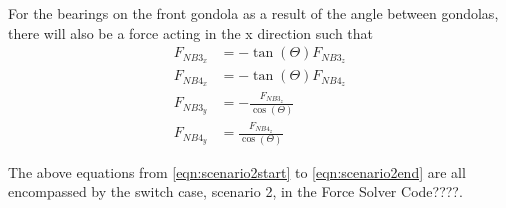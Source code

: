 \documentclass[../main.tex]{subfiles}
\begin{document}
For the bearings on the front gondola as a result of the  angle between gondolas, there will also be a force acting in the x direction such that 
\begin{align}
F_{NB3_{x}} &= -\tan(\Theta) F_{NB3_{z}}\\ 
F_{NB4_{x}} &= -\tan(\Theta) F_{NB4_{z}}\\
F_{NB3_{y}} &= -\frac{F_{NB3_{z}}}{\cos(\Theta)} \\ F_{NB4_{y}} &= \frac{F_{NB4_{z}}}{\cos(\Theta)} \label{eqn:scenario2end}
\end{align}

The above equations from \ref{eqn:scenario2start} to \ref{eqn:scenario2end} are all encompassed by the switch case, scenario 2, in the Force Solver Code????. 
\end{document}

